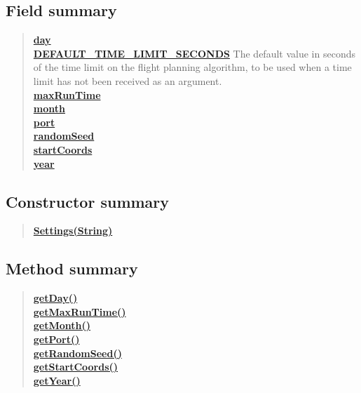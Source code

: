 \documentclass[11pt,a4paper]{report}
\begin{document}
{{{{{{{{{\subsection{Field summary}{
\begin{verse}
\hyperlink{uk.ac.ed.inf.aqmaps.Settings.day}{{\bf day}} \\
\hyperlink{uk.ac.ed.inf.aqmaps.Settings.DEFAULT_TIME_LIMIT_SECONDS}{{\bf DEFAULT\_TIME\_LIMIT\_SECONDS}} The default value in seconds of the time limit on the flight planning algorithm, to be used when a time limit has not been received as an argument.\\
\hyperlink{uk.ac.ed.inf.aqmaps.Settings.maxRunTime}{{\bf maxRunTime}} \\
\hyperlink{uk.ac.ed.inf.aqmaps.Settings.month}{{\bf month}} \\
\hyperlink{uk.ac.ed.inf.aqmaps.Settings.port}{{\bf port}} \\
\hyperlink{uk.ac.ed.inf.aqmaps.Settings.randomSeed}{{\bf randomSeed}} \\
\hyperlink{uk.ac.ed.inf.aqmaps.Settings.startCoords}{{\bf startCoords}} \\
\hyperlink{uk.ac.ed.inf.aqmaps.Settings.year}{{\bf year}} \\
\end{verse}
}
\subsection{Constructor summary}{
\begin{verse}
\hyperlink{uk.ac.ed.inf.aqmaps.Settings(java.lang.String[])}{{\bf Settings(String\lbrack \rbrack )}} \\
\end{verse}
}
\subsection{Method summary}{
\begin{verse}
\hyperlink{uk.ac.ed.inf.aqmaps.Settings.getDay()}{{\bf getDay()}} \\
\hyperlink{uk.ac.ed.inf.aqmaps.Settings.getMaxRunTime()}{{\bf getMaxRunTime()}} \\
\hyperlink{uk.ac.ed.inf.aqmaps.Settings.getMonth()}{{\bf getMonth()}} \\
\hyperlink{uk.ac.ed.inf.aqmaps.Settings.getPort()}{{\bf getPort()}} \\
\hyperlink{uk.ac.ed.inf.aqmaps.Settings.getRandomSeed()}{{\bf getRandomSeed()}} \\
\hyperlink{uk.ac.ed.inf.aqmaps.Settings.getStartCoords()}{{\bf getStartCoords()}} \\
\hyperlink{uk.ac.ed.inf.aqmaps.Settings.getYear()}{{\bf getYear()}} \\
\end{verse}
}
}}}}}}}}}
\end{document}
